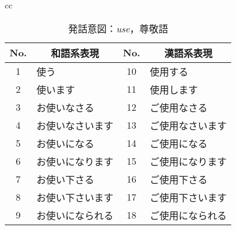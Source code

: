 \begin{table}[htbp]
\begin{center}
{\begin{tabular}{cc}
\begin{minipage}[t]{0.5\hsize}
\begin{center}
\caption{発話意図：{\it use}，尊敬語} 
\label{tbl2:table1.2} 
\begin{tabular}{|c||l|c||l|} 
\hline 
No. & \multicolumn{1}{|c|}{和語系表現} & No. & \multicolumn{1}{|c|}{漢語系表現} \\
\hline 
1&	使う&			10&	使用する \\
\hline 
2&	使います&		11&	使用します\\
\hline 
3&	お使いなさる&		12&	ご使用なさる\\
\hline 
4&	お使いなさいます&	13&	ご使用なさいます\\
\hline 
5&	お使いになる&		14&	ご使用になる\\
\hline 
6&	お使いになります&	15&	ご使用になります\\
\hline 
7&	お使い下さる&		16&	ご使用下さる\\
\hline 
8&	お使い下さいます&	17&	ご使用下さいます\\
\hline 
9&	お使いになられる&	18&	ご使用になられる\\
\hline 
\end{tabular} 

\end{center}
\end{minipage}
\end{tabular}
}
\end{center}
\end{table} 

\vspace{-2.5\baselineskip} 

\addtocounter{appndnum}{1}
\setcounter{table}{0}

